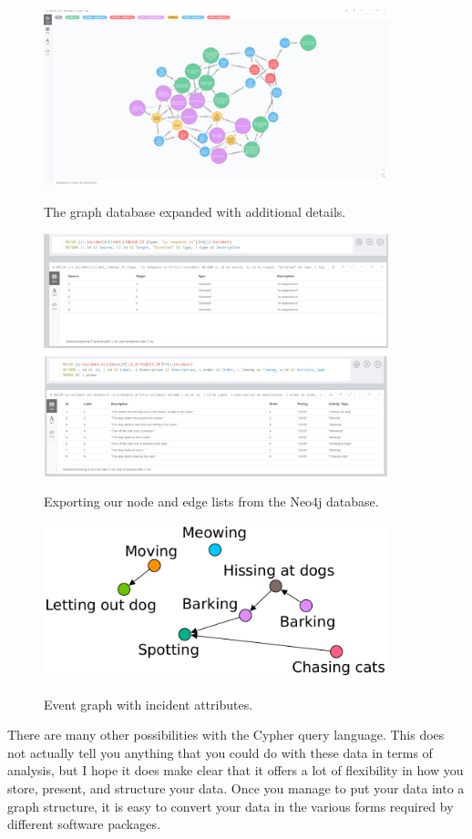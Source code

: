 \documentclass{memoir}
\begin{document}
\begin{figure}[h!]
  \centering
  \caption{The graph database expanded with additional details.}
  \includegraphics[width=100mm]{Screenshot_18.pdf}
  \label{fig:expandedgraphdatabase}
\end{figure}

\begin{figure}[h!]
  \centering
  \caption{Exporting our node and edge lists from the Neo4j database.}
  \includegraphics[width=100mm]{Screenshot_20.pdf}
  \label{fig:exportingneo4j}
\end{figure}

\begin{figure}[h!]
  \centering
  \caption{Event graph with incident attributes.}
  \includegraphics[width=100mm]{Diagram_5.pdf}
  \label{fig:eventgraphtwo}
\end{figure}

There are many other possibilities with the Cypher query language. This does not actually tell you anything that you could do with these data in terms of analysis, but I hope it does make clear that it offers a lot of flexibility in how you store, present, and structure your data. Once you manage to put your data into a graph structure, it is easy to convert your data in the various forms required by different software packages.
\end{document}
